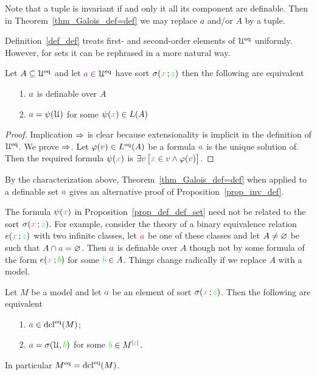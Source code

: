 \documentclass[creche.tex]{subfiles}
\begin{document}
Note that a tuple is invariant if and only it all its component are definable. Then in Theorem~\ref{thm_Galois_def=def} we may replace $a$ and/or $A$ by a tuple.

Definition~\ref{def_def} treats first- and second-order elements of $\EuScript U^{{\rm eq}}$ uniformly. However, for sets it can be rephrased in a more natural way.

\begin{proposition}\label{prop_def_def_set}
Let $A\subseteq\EuScript U^{{\rm eq}}$ and let ${\color{violet} a}\in\EuScript U^{{\rm eq}}$ have sort $\sigma({\color{brown} x}\,;{\color{green} z})$ then the following are equivalent
\begin{itemize}
\item[1.] ${\color{violet} a}$ is definable over $A$
\item[2.] ${\color{violet} a}=\psi(\EuScript U)$ for some $\psi({\color{brown} x})\in L(A)$
\end{itemize}
\end{proposition}

\begin{proof}
Implication $\Rightarrow$ is clear because extensionality is implicit in the definition of $\EuScript U^{{\rm eq}}$. We prove $\Rightarrow$. Let $\varphi({\color{violet} v})\in L^{{\rm eq}}(A)$ be a formula ${\color{violet} a}$ is the unique solution of. Then the required formula $\psi({\color{brown} x})$ is $\exists {\color{violet}v}\,\big[{\color{brown} x}\in {\color{violet}v}\wedge\varphi({\color{violet} v})\big]$.
\end{proof}

By the characterization above, Theorem~\ref{thm_Galois_def=def} when applied to a definable set ${\color{violet} a}$ gives an alternative proof of Proposition~\ref{prop_inv_def}.

The formula $\psi({\color{brown} x})$ in Proposition~\ref{prop_def_def_set} need not be related to the sort $\sigma({\color{brown} x}\,;{\color{green} z})$. For example, consider the theory of a binary equivalence relation $e({\color{brown} x}\,;{\color{green} z})$ with two infinite classes, let ${\color{violet} a}$ be one of these classes and let $A\neq\varnothing$ be such that $A\cap {\color{violet}a}=\varnothing$. Then ${\color{violet} a}$ is definable over $A$ though not by some formula of the form $e({\color{brown} x}\,;{\color{green} b})$ for some ${\color{green} b}\in A$. Things change radically if we replace $A$ with a model.  


\begin{proposition}\label{prop_standard_def_set}
Let $M$ be a model and let ${\color{violet} a}$ be an element of sort $\sigma({\color{brown} x}\,;{\color{green} z})$. Then the following are equivalent
\begin{itemize}
\item[1.]  ${\color{violet} a}\in\mathop{\rm dcl}^{{\rm eq}}(M)$; 
\item[2.]  ${\color{violet} a}=\sigma(\EuScript U,{\color{green} b})$ for some ${\color{green} b}\in M^{|{\color{green} z}|}$.
\end{itemize}
In particular $M^{{\rm eq}}=\mathop{\rm dcl}^{{\rm eq}}(M)$.
\end{proposition}
\end{document}

